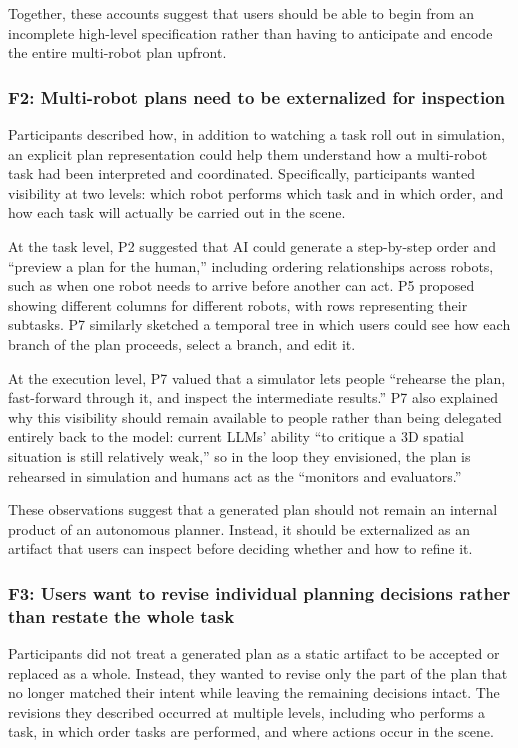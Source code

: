 Together, these accounts suggest that users should be able to begin from an incomplete high-level specification rather than having to anticipate and encode the entire multi-robot plan upfront.


\subsubsection{F2: Multi-robot plans need to be externalized for inspection}

Participants described how, in addition to watching a task roll out in simulation, an explicit plan representation could help them understand how a multi-robot task had been interpreted and coordinated.
Specifically, participants wanted visibility at two levels: which robot performs which task and in which order, and how each task will actually be carried out in the scene.

At the task level, P2 suggested that AI could generate a step-by-step order and ``preview a plan for the human,'' including ordering relationships across robots, such as when one robot needs to arrive before another can act.
P5 proposed showing different columns for different robots, with rows representing their subtasks.
P7 similarly sketched a temporal tree in which users could see how each branch of the plan proceeds, select a branch, and edit it.

At the execution level, P7 valued that a simulator lets people ``rehearse the plan, fast-forward through it, and inspect the intermediate results.''
P7 also explained why this visibility should remain available to people rather than being delegated entirely back to the model: current LLMs' ability ``to critique a 3D spatial situation is still relatively weak,'' so in the loop they envisioned, the plan is rehearsed in simulation and humans act as the ``monitors and evaluators.''

These observations suggest that a generated plan should not remain an internal product of an autonomous planner.
Instead, it should be externalized as an artifact that users can inspect before deciding whether and how to refine it.


\subsubsection{F3: Users want to revise individual planning decisions rather than restate the whole task}

Participants did not treat a generated plan as a static artifact to be accepted or replaced as a whole.
Instead, they wanted to revise only the part of the plan that no longer matched their intent while leaving the remaining decisions intact.
The revisions they described occurred at multiple levels, including who performs a task, in which order tasks are performed, and where actions occur in the scene.

